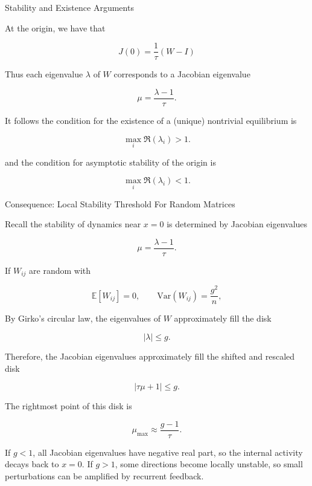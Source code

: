 \documentclass[
11pt,notheorems,hyperref={pdfauthor=whatever}
]{beamer}
\begin{document}
\begin{frame}{Stability and Existence Arguments}

At the origin, we have that 

\[
J(0) = \frac{1}{\tau}(W - I)
\]

Thus each eigenvalue \(\lambda\) of \(W\) corresponds to a Jacobian eigenvalue

\[
\mu
=
\frac{\lambda-1}{\tau}.
\]

It follows the condition for the existence of a (unique) nontrivial equilibrium is

\[
\max_i \mathfrak{R}(\lambda_i) > 1.
\]

and the condition for asymptotic stability of the origin is

\[
\max_i \mathfrak{R}(\lambda_i) < 1.
\]

\end{frame}

\begin{frame}{Consequence: Local Stability Threshold For Random Matrices}
\small

Recall the stability of dynamics near \(x=0\) is determined by Jacobian eigenvalues

\[
\mu
=
\frac{\lambda-1}{\tau}.
\]

If \(W_{ij}\) are random with

\[
\mathbb{E}[W_{ij}]=0,
\qquad
\mathrm{Var}(W_{ij})=\frac{g^2}{n},
\]

By Girko's circular law, the eigenvalues of \(W\) approximately fill the disk

\[
|\lambda|\leq g.
\]

Therefore, the Jacobian eigenvalues approximately fill the shifted and rescaled disk

\[
\left|\tau \mu + 1\right| \leq g.
\]

The rightmost point of this disk is

\[
\mu_{\max}
\approx
\frac{g-1}{\tau}.
\]

If \(g<1\), all Jacobian eigenvalues have negative real part, so the internal
activity decays back to \(x=0\). If \(g>1\), some directions become locally
unstable, so small perturbations can be amplified by recurrent feedback.

\end{frame}
\end{document}
